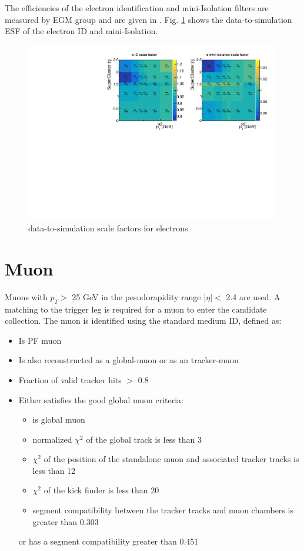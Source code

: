 \documentclass[thesis.tex]{subfiles}
\renewcommand\_{\textunderscore\allowbreak}
\begin{document}
The efficiencies of the electron identification and mini-Isolation filters are measured by EGM group and are given in \cite{EGM:leptonScale}. Fig. \ref{fig:elesf} shows the data-to-simulation ESF of the electron ID and mini-Isolation. 

\begin{figure}[hbtp]
	\centering
	\includegraphics[width=0.99\textwidth]{plot/SF_Ele.pdf}
	\caption{data-to-simulation scale factors for electrons.}
	\label{fig:elesf}
\end{figure}

\section{Muon}
Muons with $p_{T} >$ 25 GeV in the pesudorapidity range $|\eta| <$ 2.4 are used. 
A matching to the trigger leg is required for a muon to enter the candidate collection. 
The muon is identified using the standard medium ID, defined as:

\begin{center}
\begin{itemize}
\item Is PF muon
\item Is also reconstructed as a global-muon or as an tracker-muon
\item Fraction of valid tracker hits $>$ 0.8
\item Either satisfies the good global muon criteria:
	\begin{itemize}
		\item is global muon
		\item normalized $\chi^2$ of the global track is less than 3
		\item $\chi^2$ of the position of the standalone muon and associated tracker tracks is less than 12
		\item $\chi^2$ of the kick finder is less than 20
		\item segment compatibility between the tracker tracks and muon chambers is greater than 0.303
	\end{itemize} 
	or has a segment compatibility greater than 0.451
\end{itemize}
\end{center}
\end{document}
